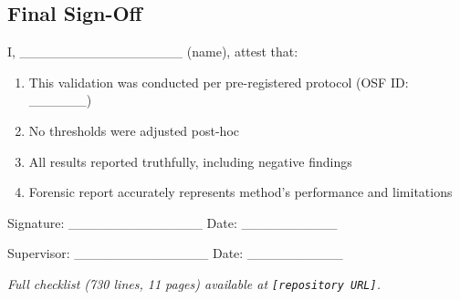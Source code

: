 \subsection{Final Sign-Off}

I, \_\_\_\_\_\_\_\_\_\_\_\_\_\_\_\_\_ (name), attest that:
\begin{enumerate}
\item This validation was conducted per pre-registered protocol (OSF ID: \_\_\_\_\_\_)
\item No thresholds were adjusted post-hoc
\item All results reported truthfully, including negative findings
\item Forensic report accurately represents method's performance and limitations
\end{enumerate}

\noindent Signature: \_\_\_\_\_\_\_\_\_\_\_\_\_\_ \quad Date: \_\_\_\_\_\_\_\_\_\_

\noindent Supervisor: \_\_\_\_\_\_\_\_\_\_\_\_\_\_ \quad Date: \_\_\_\_\_\_\_\_\_\_

\vspace{0.3cm}

\noindent \textit{Full checklist (730 lines, 11 pages) available at \texttt{[repository URL]}.}

